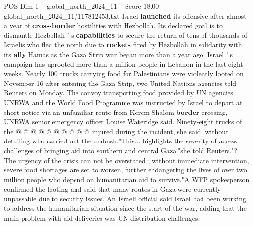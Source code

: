 \begin{textsample}{POS Dim 1 – global\_north\_2024\_11 – Score 18.00 – global\_north\_2024\_11/117812453.txt}
Israel \textbf{launched} its offensive after almost a year of \textbf{cross-border} hostilities with Hezbollah.
Its declared goal is to dismantle Hezbollah ' s \textbf{capabilities} to secure the return of tens of thousands of Israelis who fled the north due to \textbf{rockets} fired by Hezbollah in solidarity with its \textbf{ally} Hamas as the Gaza Strip war began more than a year ago.
Israel ' s campaign has uprooted more than a million people in Lebanon in the last eight weeks.
Nearly 100 trucks carrying food for Palestinians were violently looted on November 16 after entering the Gaza Strip, two United Nations agencies told Reuters on Monday.
The convoy transporting food provided by UN agencies UNRWA and the World Food Programme was instructed by Israel to depart at short notice via an unfamiliar route from Kerem Shalom \textbf{border} crossing, UNRWA senior emergency officer Louise Wateridge said.
Ninety-eight trucks of the @ @ @ @ @ @ @ @ @ @ injured during the incident, she said, without detailing who carried out the ambush."This... highlights the severity of access challenges of bringing aid into southern and central Gaza,"she told Reuters."?
The urgency of the crisis can not be overstated ; without immediate intervention, severe food shortages are set to worsen, further endangering the lives of over two million people who depend on humanitarian aid to survive."A WFP spokesperson confirmed the looting and said that many routes in Gaza were currently unpassable due to security issues.
An Israeli official said Israel had been working to address the humanitarian situation since the start of the war, adding that the main problem with aid deliveries was UN distribution challenges.

\end{textsample}
